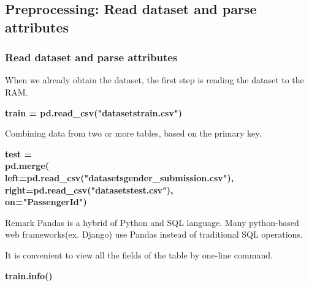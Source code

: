 \documentclass{beamer}
\begin{document}
\subsection{Preprocessing: Read dataset and parse attributes}
\begin{frame}
	\frametitle{Read dataset and parse attributes}
	\begin{flushleft}
		When we already obtain the dataset, the first step is reading the dataset to the RAM.
	\end{flushleft}
	\begin{center}
		\textbf{\color{blue}\footnotesize train = pd.read\_csv("datasets\/train.csv")}
	\end{center}
	\begin{flushleft}
		Combining data from two or more tables, based on the primary key.
	\end{flushleft}
	\begin{center}
		\textbf{\color{blue} \footnotesize
			test = pd.merge(~~~~~~~~~~~~~~~~~~~~~~~~~~~~~~~~~~~~~~~~~~~~~~~~~~~ \\
			left=pd.read\_csv("datasets\/gender\_submission.csv"), \\
			right=pd.read\_csv("datasets\/test.csv"),~~~~~~~~~~~~~~~~~ \\
			on="PassengerId")~~~~~~~~~~~~~~~~~~~~~~~~~~~~~~~~~~~~~~~~ 
		}
	\end{center}
	\begin{block}{Remark}
	Pandas is a hybrid of Python and SQL language. Many python-based web frameworks(ex. Django) use Pandas instead of traditional SQL operations.
	\end{block}
	\begin{flushleft}
		It is convenient to view all the fields of the table by one-line command.
	\end{flushleft}
	\begin{center}
		\textbf{\color{blue}\footnotesize train.info()}
	\end{center}
\end{frame}
\end{document}
